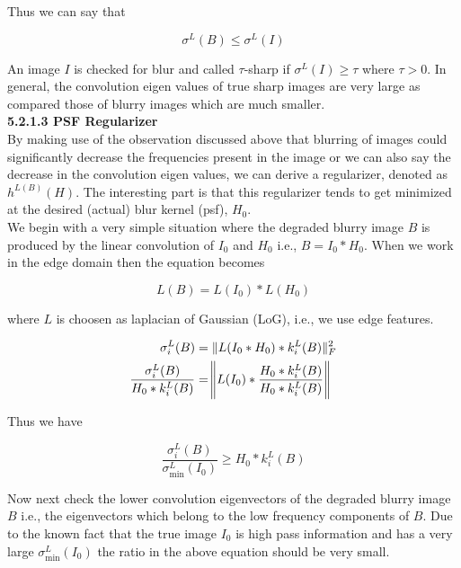 \documentclass{article}
\begin{document}
Thus we can say that 

\begin{equation}
    \sigma^{L}(B) \leq \sigma^{L}(I)
\end{equation}

An image $I$ is checked for blur and called $\tau$-sharp if $\sigma^L(I) \geq \tau$  where $\tau > 0$. In general, the convolution eigen values of true sharp images are very large as compared those of blurry images which are much smaller. \\

\textbf{5.2.1.3 PSF Regularizer} \\

By making use of the observation discussed above that blurring of images could significantly decrease the frequencies present in the image or we can also say the decrease in  the convolution eigen values, we can derive a regularizer, denoted as $h^{L(B)}(H)$. The interesting part is that this regularizer tends to get minimized at the desired (actual) blur kernel (psf), $H_0$. \\

We begin with a very simple situation where the degraded blurry image $B$ is produced by the linear convolution of $I_0$ and $H_0$ i.e., $B = I_0 * H_0$. When we work in the edge domain then the equation becomes

\begin{equation}
    L(B) = L(I_0) * L(H_0)
\end{equation}

where $L$ is choosen as laplacian of Gaussian (LoG), i.e., we use edge features. 

\begin{align}
    \sigma_i^L(B) &= \|L(I_0 * H_0) * k_i^L(B)\|^2_F \\
    \frac{\sigma_i^L(B)}{H_0 * k_i^L(B)} &= \norm{L(I_0) * \frac{H_0 * k_i^L(B)}{H_0 * k_i^L(B)}} 
\end{align}

Thus we have

\begin{equation}
    \frac{\sigma_i^L(B)}{\sigma_{\min}^L(I_0)} \geq H_0 * k_i^L(B)
\end{equation}

Now next check the lower convolution eigenvectors of the degraded blurry image $B$ i.e., the  eigenvectors which belong to the low frequency components of $B$. Due to the known fact that the true image $I_0$ is high pass information and has a very large $\sigma_{\min}^L(I_0)$ the ratio in the above equation should be very small. \\
\end{document}
